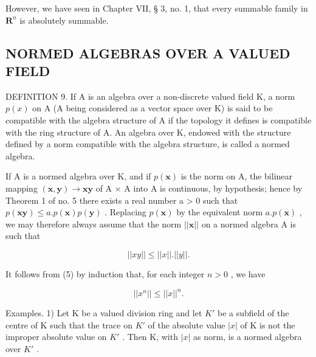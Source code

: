 However, we have seen in Chapter VII, § 3, no. 1, that every summable family in \(\mathbf{R}^n\) is absolutely summable.

\subsection{NORMED ALGEBRAS OVER A VALUED FIELD}

DEFINITION 9. If A is an algebra over a non-discrete valued field K, a norm \(p(x)\) on A (A being considered as a vector space over K) is said to be compatible with the algebra structure of A if the topology it defines is compatible with the ring structure of A. An algebra over K, endowed with the structure defined by a norm compatible with the algebra structure, is called a normed algebra.

If A is a normed algebra over K, and if \(p(\boldsymbol{x})\) is the norm on A, the bilinear mapping \((\boldsymbol{x}, \boldsymbol{y}) \to \boldsymbol{x}\boldsymbol{y}\) of A × A into A is continuous, by hypothesis; hence by Theorem 1 of no. 5 there exists a real number a \textgreater{} 0 such that \(p(\boldsymbol{x}\boldsymbol{y}) \leqslant a.p(\boldsymbol{x})p(\boldsymbol{y})\) . Replacing \(p(\boldsymbol{x})\) by the equivalent norm \(a.p(\boldsymbol{x})\) , we may therefore always assume that the norm \(||\boldsymbol{x}||\) on a normed algebra A is such that

\[
\left| \left| x y \right| \right| \leqslant \left| \left| x \right| \right|. \left| \left| y \right| \right|.\tag{5}
\]

It follows from (5) by induction that, for each integer \(n > 0\) , we have

\[
\left| \left| x ^ {n} \right| \right| \leqslant \left| \left| x \right| \right| ^ {n}.\tag{6}
\]

Examples. 1) Let K be a valued division ring and let \(K'\) be a subfield of the centre of K such that the trace on \(K'\) of the absolute value \(|x|\) of K is not the improper absolute value on \(K'\) . Then K, with \(|x|\) as norm, is a normed algebra over \(K'\) .

